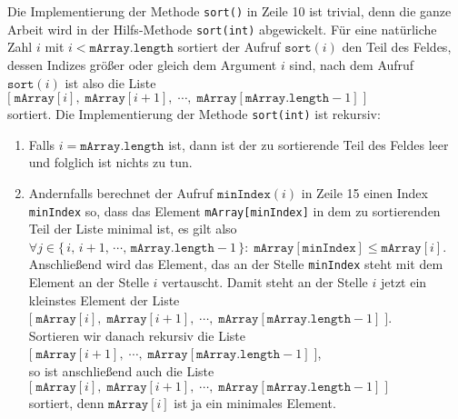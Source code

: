 Die Implementierung der Methode \texttt{sort()} in Zeile 10 ist trivial, denn die ganze
Arbeit wird in der Hilfs-Methode \texttt{sort(int)} abgewickelt.  F\"ur eine 
nat\"urliche Zahl $i$ mit $i < \mathtt{mArray.length}$ sortiert der Aufruf 
 $\texttt{sort}(i)$ 
den Teil des Feldes, dessen Indizes gr\"o{\ss}er oder gleich dem Argument $i$ sind, nach dem
Aufruf $\mathtt{sort}(i)$ ist also die Liste \\[0.1cm]
\hspace*{1.3cm} 
$\bigl[\;\mathtt{mArray}[i],\;\mathtt{mArray}[i+1],\;\cdots,\;\mathtt{mArray}[\mathtt{mArray.length}-1] \;\bigr]$
\\[0.1cm]
sortiert.  Die Implementierung der Methode \texttt{sort(int)} ist rekursiv:
\begin{enumerate}
\item Falls $i = \mathtt{mArray.length}$ ist, dann ist der zu sortierende Teil des 
      Feldes leer und folglich ist nichts zu tun.
\item Andernfalls berechnet der Aufruf $\texttt{minIndex}(i)$ in Zeile 15 einen Index
      \texttt{minIndex} so, dass das Element \texttt{mArray[minIndex]} in dem zu
      sortierenden Teil der Liste minimal ist, es gilt also \\[0.1cm]
      \hspace*{1.3cm} 
      $\forall j \in \bigl\{\, i,\, i+1,\, \cdots,\, \texttt{mArray.length} -1\, \} \colon\;
       \texttt{mArray}[\texttt{minIndex}] \leq \texttt{mArray}[i]$. \\[0.1cm]
      Anschlie{\ss}end wird das Element, das an der Stelle \texttt{minIndex} steht mit dem
      Element an der Stelle $i$ vertauscht.  Damit steht an der Stelle $i$ jetzt ein
      kleinstes Element der Liste \\[0.1cm]
      \hspace*{1.3cm} $\bigl[\;\mathtt{mArray}[i],\;\mathtt{mArray}[i+1],\;\cdots,\;\mathtt{mArray}[\mathtt{mArray.length}-1] \;\bigr]$.
      \\[0.1cm]
      Sortieren wir danach rekursiv die Liste \\[0.1cm]
      \hspace*{1.3cm} $\bigl[\;\mathtt{mArray}[i+1],\;\cdots,\;\mathtt{mArray}[\mathtt{mArray.length}-1] \;\bigr]$,
      \\[0.1cm]
      so ist anschlie{\ss}end auch die Liste \\[0.1cm]
      \hspace*{1.3cm}
      $\bigl[\;\mathtt{mArray}[i],\;\mathtt{mArray}[i+1],\;\cdots,\;\mathtt{mArray}[\mathtt{mArray.length}-1] \;\bigr]$
      \\[0.1cm]
      sortiert, denn $\texttt{mArray}[i]$ ist ja ein minimales Element.
\end{enumerate}
